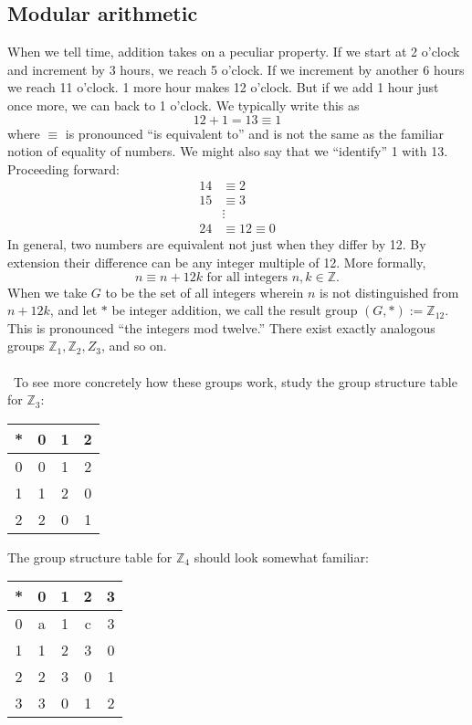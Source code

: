 \documentclass[12 pt]{article}
\newcommand{\Z}{\mathbb{Z}}
\numberwithin{equation}{section}
\begin{document}
\subsection{Modular arithmetic}
When we tell time, addition takes on a peculiar property. If we start at 2 o'clock and increment by 3 hours, we reach 5 o'clock. If we increment by another 6 hours we reach 11 o'clock. 1 more hour makes 12 o'clock. But if we add 1 hour just once more, we can back to 1 o'clock. We typically write this as \begin{equation*}
12 + 1 = 13 \equiv 1
\end{equation*}
where $\equiv$ is pronounced ``is equivalent to'' and is not the same as the familiar notion of equality of numbers. We might also say that we ``identify'' 1 with 13. Proceeding forward:
\begin{align*}
14 & \equiv 2 \\
15 & \equiv 3 \\
\ & \vdots \ \\
24 & \equiv 12 \equiv 0
\end{align*}
In general, two numbers are equivalent not just when they differ by 12. By extension their difference can be any integer multiple of 12. More formally,
\begin{equation*}
n \equiv n + 12k \mbox{ for all integers } n, k \in \Z .
\end{equation*}
When we take $G$ to be the set of all integers wherein $n$ is not distinguished from $n + 12k$, and let $*$ be integer addition, we call the result group $(G, *) := \Z_{12}$. This is pronounced ``the integers mod twelve.'' There exist exactly analogous groups $\Z_1, \Z_2, Z_3$, and so on.
\\
\\
\
To see more concretely how these groups work, study the group structure table for $\Z_3$:
\begin{center}
\begin{tabular}{c | c c c }
* & 0 & 1 & 2 \\
\hline
0 & 0 & 1 & 2 \\
1 & 1 & 2 & 0 \\
2 & 2 & 0 & 1
\end{tabular}
\end{center}
The group structure table for $\Z_4$ should look somewhat familiar:
\begin{center}
\begin{tabular}{c | c c c c}
* & 0 & 1 & 2 & 3 \\
\hline
0 & a & 1 & c & 3 \\
1 & 1 & 2 & 3 & 0 \\
2 & 2 & 3 & 0 & 1 \\
3 & 3 & 0 & 1 & 2
\end{tabular}
\end{center}
\end{document}
